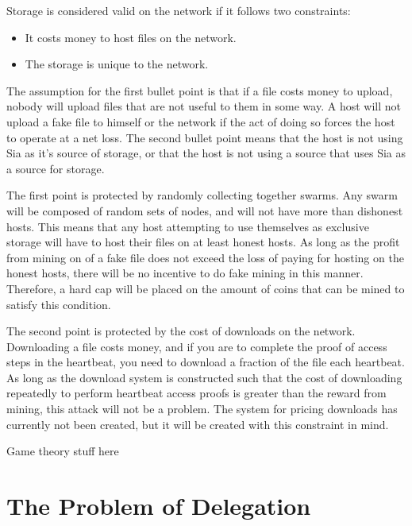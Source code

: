 \documentclass[twocolumn]{article}
\begin{document}
Storage is considered valid on the network if it follows two constraints:

\begin{itemize}
	\item It costs money to host files on the network.
	\item The storage is unique to the network.
\end{itemize}

The assumption for the first bullet point is that if a file costs money to upload, nobody will upload files that are not useful to them in some way.
A host will not upload a fake file to himself or the network if the act of doing so forces the host to operate at a net loss.
The second bullet point means that the host is not using Sia as it's source of storage, or that the host is not using a source that uses Sia as a source for storage.

The first point is protected by randomly collecting together swarms.
Any swarm will be composed of random sets of nodes, and will not have more than \maxcorruption{} dishonest hosts.
This means that any host attempting to use themselves as exclusive storage will have to host their files on at least \inversemaxcorruption{} honest hosts.
As long as the profit from mining on \maxcorruption{} of a fake file does not exceed the loss of paying for hosting on the \inversemaxcorruption honest hosts, there will be no incentive to do fake mining in this manner.
Therefore, a hard cap will be placed on the amount of coins that can be mined to satisfy this condition.

The second point is protected by the cost of downloads on the network.
Downloading a file costs money, and if you are to complete the proof of access steps in the heartbeat, you need to download a fraction of the file each heartbeat.
As long as the download system is constructed such that the cost of downloading repeatedly to perform heartbeat access proofs is greater than the reward from mining, this attack will not be a problem.
The system for pricing downloads has currently not been created, but it will be created with this constraint in mind.

\begin{center}
Game theory stuff here
\end{center}

\section{The Problem of Delegation}
\end{document}
